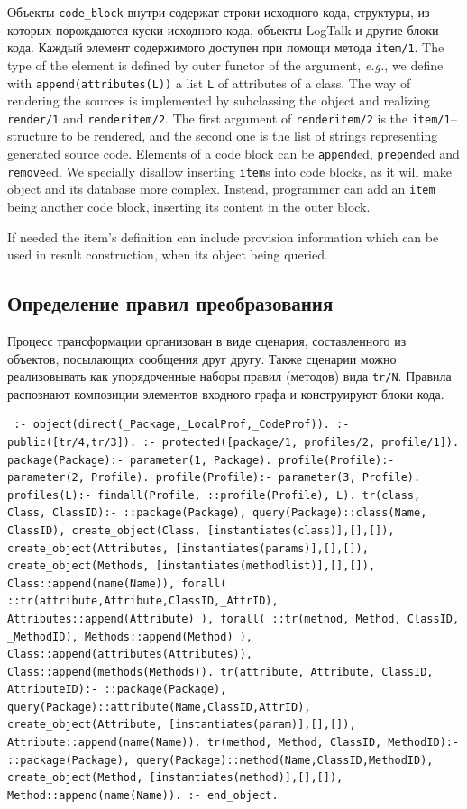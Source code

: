 \documentclass[conference]{IEEEtran} \IEEEoverridecommandlockouts
\begin{document}
Объекты \verb|code_block| внутри содержат строки исходного кода, структуры, из которых порождаются куски исходного кода, объекты LogTalk и другие блоки кода. Каждый элемент содержимого доступен при помощи метода \verb|item/1|. The type of the element is defined by outer functor of the argument, \emph{e.g.}, we define with \verb|append(attributes(L))| a list \verb|L| of attributes of a class. The way of rendering the sources is implemented by subclassing the object and realizing \verb|render/1| and \verb|renderitem/2|. The first argument of \verb|renderitem/2| is the \verb|item/1|--structure to be rendered, and the second one is the list of strings representing generated source code. Elements of a code block can be \verb|append|ed, \verb|prepend|ed and \verb|remove|ed. We specially disallow inserting \verb|item|s into code blocks, as it will make object and its database more complex. Instead, programmer can add an \verb|item| being another code block, inserting its content in the outer block. 

If needed the item's definition can include provision information which can be used in result construction, when its object being queried. 

\subsection{Определение правил преобразования} \label{sec:mda-rules} 

Процесс трансформации организован в виде сценария, составленного из объектов, посылающих сообщения друг другу. Также сценарии можно реализовывать как упорядоченные наборы правил (методов) вида \verb|tr/N|. Правила распознают композиции элементов входного графа и конструируют блоки кода. 

\begin{verbatim} :- object(direct(_Package,_LocalProf,_CodeProf)). :- public([tr/4,tr/3]). :- protected([package/1, profiles/2, profile/1]). package(Package):- parameter(1, Package). profile(Profile):- parameter(2, Profile). profile(Profile):- parameter(3, Profile). profiles(L):- findall(Profile, ::profile(Profile), L). tr(class, Class, ClassID):- ::package(Package), query(Package)::class(Name, ClassID), create_object(Class, [instantiates(class)],[],[]), create_object(Attributes, [instantiates(params)],[],[]), create_object(Methods, [instantiates(methodlist)],[],[]), Class::append(name(Name)), forall( ::tr(attribute,Attribute,ClassID,_AttrID), Attributes::append(Attribute) ), forall( ::tr(method, Method, ClassID, _MethodID), Methods::append(Method) ), Class::append(attributes(Attributes)), Class::append(methods(Methods)). tr(attribute, Attribute, ClassID, AttributeID):- ::package(Package), query(Package)::attribute(Name,ClassID,AttrID), create_object(Attribute, [instantiates(param)],[],[]), Attribute::append(name(Name)). tr(method, Method, ClassID, MethodID):- ::package(Package), query(Package)::method(Name,ClassID,MethodID), create_object(Method, [instantiates(method)],[],[]), Method::append(name(Name)). :- end_object. \end{verbatim} 
\end{document}
